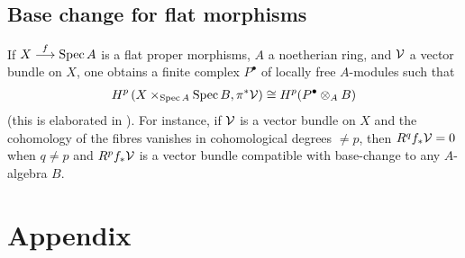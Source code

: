 \documentclass[a4paper,parskip=half,numbers=enddot, DIV=12]{scrreprt}
\begin{document}
\section{Base change for flat morphisms}
If $X\morphism[f]\Spec A$ is a flat proper morphisms, $A$ a noetherian ring, and $\mathcal{V}$ a vector bundle on $X$, one obtains a finite complex $P^\bullet$ of locally free $A$-modules such that 
\begin{align*}
	H^p\left(X\times_{\operatorname{Spec} A}\operatorname{Spec} B,\pi^*\mathcal{V}\right)\cong H^p(P^\bullet\otimes_AB)
\end{align*}
(this is elaborated in \cite[Theorem~4]{jacobians}). For instance, if $\mathcal{V}$ is a vector bundle on $X$ and the cohomology of the fibres vanishes in cohomological degrees $\neq p$, then $R^qf_*\mathcal{V}=0$ when $q\neq p$ and $R^pf_*\mathcal{V}$ is a vector bundle compatible with base-change to any $A$-algebra $B$.


\Appendix
\chapter{Appendix}
\end{document}
